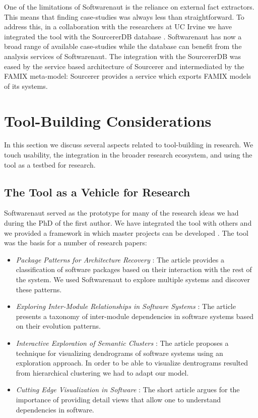 \documentclass[preprint,12pt]{elsarticle}
\begin{document}
One of the limitations of Softwarenaut is the reliance on external fact extractors. This means that finding case-studies was always less than straightforward. To address this, in a collaboration with the researchers at UC Irvine we have integrated the tool with the SourcererDB database \cite{linstead-sourcerer}. Softwarenaut has now a broad range of available case-studies while the database can benefit from the analysis services of Softwarenaut. The integration with the SourcererDB was eased by the service based architecture of Sourcerer and intermediated by the FAMIX meta-model: Sourcerer provides a service which exports FAMIX models of its systems. 


\section {Tool-Building Considerations} \label {sec:disc}

In this section we discuss several aspects related to tool-building in research. We touch usability, the integration in the broader research ecosystem, and using the tool as a testbed for research.


\subsection {The Tool as a Vehicle for Research}
Softwarenaut served as the prototype for many of the research ideas we had during the PhD of the first author. We have integrated the tool with others \cite{lungu-clust, lungu-scico, nier-story} and we provided a framework in which master projects can be developed \cite{boeckmann-mars}. %
The tool was the basis for a number of research papers: 
\begin{itemize}
\item {\em Package Patterns for Architecture Recovery} \cite{lungu-packages}: The article provides a classification of software packages based on their interaction with the rest of the system. We used Softwarenaut to explore multiple systems and discover these patterns.
\item {\em Exploring Inter-Module Relationships in Software Systems} \cite{lungu-relevo}: The article presents a taxonomy of inter-module dependencies in software systems based on their evolution patterns.
\item {\em Interactive Exploration of Semantic Clusters} \cite{lungu-clust}: The article proposes a technique for visualizing dendrograms of software systems using an exploration approach. In order to be able to visualize dentrograms resulted from hierarchical clustering we had to adapt our model.
\item {\em Cutting Edge Visualization in Software} \cite{lungu-cutedge}: The short article argues for the importance of providing detail views that allow one to understand dependencies in software.
\end{itemize}
\end{document}
